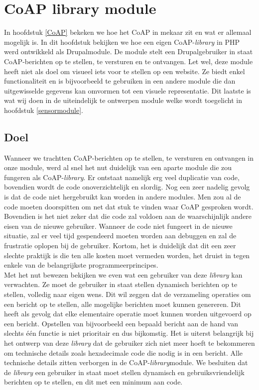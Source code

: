 \chapter{CoAP library module} \label{coaplibrary}

In hoofdstuk \ref{CoAP} bekeken we hoe het CoAP in mekaar zit en wat er allemaal mogelijk is. In dit hoofdstuk bekijken we hoe een eigen CoAP-\textit{library} in PHP werd ontwikkeld als Drupalmodule. De module stelt een Drupalgebruiker in staat CoAP-berichten op te stellen, te versturen en te ontvangen. Let wel, deze module heeft niet als doel om visueel iets voor te stellen op een website. Ze biedt enkel functionaliteit en is bijvoorbeeld te gebruiken in een andere module die dan uitgewisselde gegevens kan omvormen tot een visuele representatie. Dit laatste is wat wij doen in de uiteindelijk te ontwerpen module welke wordt toegelicht in hoofdstuk \ref{sensormodule}.

\section{Doel}

Wanneer we trachtten CoAP-berichten op te stellen, te versturen en ontvangen in onze module, werd al snel het nut duidelijk van een aparte module die zou fungeren als CoAP-\textit{library}. Er ontstaat namelijk erg veel duplicatie van code, bovendien wordt de code onoverzichtelijk en slordig. Nog een zeer nadelig gevolg is dat de code niet hergebruikt kan worden in andere modules. Men zou al de code moeten doorspitten om net dat stuk te vinden waar CoAP gesproken wordt. Bovendien is het niet zeker dat die code zal voldoen aan de waarschijnlijk andere eisen van de nieuwe gebruiker. Wanneer de code niet fungeert in de nieuwe situatie, zal er veel tijd gespendeerd moeten worden aan debuggen en zal de frustratie oplopen bij de gebruiker. Kortom, het is duidelijk dat dit een zeer slechte praktijk is die ten alle kosten moet vermeden worden, het druist in tegen enkele van de belangrijkste programmeerprincipes.\\

\newpage
Met het nut bewezen bekijken we even wat een gebruiker van deze \textit{library} kan verwachten. Ze moet de gebruiker in staat stellen dynamisch berichten op te stellen, volledig naar eigen wens. Dit wil zeggen dat de verzameling operaties om een bericht op te stellen, alle mogelijke berichten moet kunnen genereren. Dit heeft als gevolg dat elke elementaire operatie moet kunnen worden uitgevoerd op een bericht. Opstellen van bijvoorbeeld een bepaald bericht aan de hand van slechts \'{e}\'{e}n functie is niet prioritair en dus bijkomstig. Het is uiterst belangrijk bij het ontwerp van deze \textit{library} dat de gebruiker zich niet meer hoeft te bekommeren om technische details zoals hexadecimale code die nodig is in een bericht. Alle technische details zitten verborgen in de CoAP-\textit{library}module. We besluiten dat de \textit{library} een gebruiker in staat moet stellen dynamisch en gebruiksvriendelijk berichten op te stellen, en dit met een minimum aan code.

